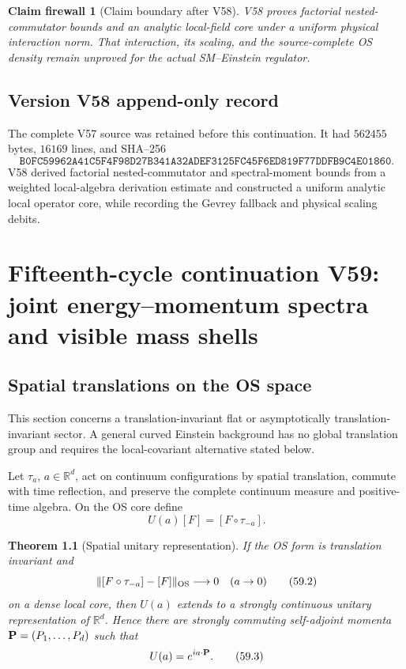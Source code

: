 \documentclass[11pt]{article}
\newtheorem{theorem}{Theorem}[section]
\newtheorem{firewall}[theorem]{Claim firewall}
\theoremstyle{remark}
\begin{document}
\begin{firewall}[Claim boundary after V58]
\label{fire:v15v58}
V58 proves factorial nested-commutator bounds and an analytic
local-field core under a uniform physical interaction norm.  That
interaction, its scaling, and the source-complete OS density remain
unproved for the actual SM--Einstein regulator.
\end{firewall}

\section*{Version V58 append-only record}
The complete V57 source was retained before this continuation.  It
had \(562455\) bytes, \(16169\) lines, and SHA--256
\[
 \texttt{B0FC59962A41C5F4F98D27B341A32ADEF3125FC45F6ED819F77DDFB9C4E01860}.
\]
V58 derived factorial nested-commutator and spectral-moment bounds
from a weighted local-algebra derivation estimate and constructed a
uniform analytic local operator core, while recording the Gevrey
fallback and physical scaling debits.

\chapter{Fifteenth-cycle continuation V59: joint energy--momentum spectra and visible mass shells}
\label{sec:v15v59}

\section{Spatial translations on the OS space}

This section concerns a translation-invariant flat or asymptotically
translation-invariant sector.  A general curved Einstein background
has no global translation group and requires the local-covariant
alternative stated below.

Let \(\tau_a\), \(a\in\mathbb R^d\), act on continuum
configurations by spatial translation, commute with time reflection,
and preserve the complete continuum measure and positive-time
algebra.  On the OS core define
\[
 U(a)[F]=[F\circ\tau_{-a}].                              \tag{59.1}
\]

\begin{theorem}[Spatial unitary representation]
\label{thm:v15v59-spatial}
If the OS form is translation invariant and
\[
 \|[F\circ\tau_{-a}]-[F]\|_{\rm OS}\longrightarrow0
 \quad(a\to0)                                           \tag{59.2}
\]
on a dense local core, then \(U(a)\) extends to a strongly
continuous unitary representation of \(\mathbb R^d\).  Hence there
are strongly commuting self-adjoint momenta
\({\bf P}=(P_1,\ldots,P_d)\) such that
\[
 U(a)=e^{i a\cdot{\bf P}}.                              \tag{59.3}
\]
\end{theorem}
\end{document}

